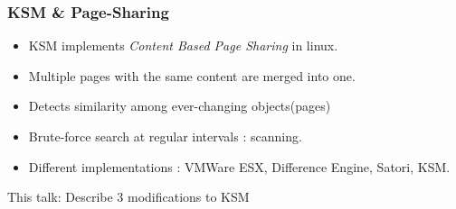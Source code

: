 \documentclass{beamer}
\begin{document}
\begin{frame}
\frametitle{KSM \& Page-Sharing}
\begin{itemize}
  \item \alert{KSM } implements \emph{Content Based Page Sharing} in linux.
  \item Multiple pages with the same content are merged into one.
  \item Detects similarity among ever-changing objects(pages)
  \item Brute-force search at regular intervals : scanning.
  \item Different implementations : VMWare ESX, Difference Engine, Satori, KSM.  
\end{itemize}

\alert{This talk: Describe 3 modifications to KSM }

\end{frame}




\end{document}
